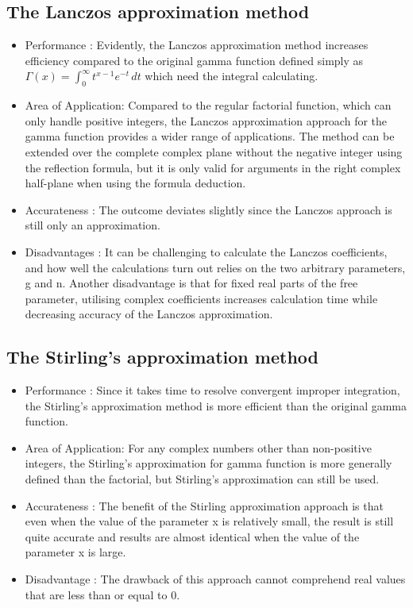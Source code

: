 \documentclass[a4paper, 11pt]{article}
\begin{document}
\subsection{ The Lanczos approximation method}
\begin{itemize}
    \item{Performance : Evidently, the Lanczos approximation method increases efficiency compared to the original gamma function defined simply as ${\displaystyle \Gamma (x)=\int _{0}^{\infty }t^{x-1}e^{-t}\,dt}$ which need the integral calculating.}
    
    \item{Area of Application: Compared to the regular factorial function, which can only handle positive integers, the Lanczos approximation approach for the gamma function provides a wider range of applications. The method can be extended over the complete complex plane without the negative integer using the reflection formula, but it is only valid for arguments in the right complex half-plane when using the formula deduction.}
    
    \item{Accurateness : The outcome deviates slightly since the Lanczos approach is still only an approximation.}
    
    \item{Disadvantages : It can be challenging to calculate the Lanczos coefficients, and how well the calculations turn out relies on the two arbitrary parameters, g and n. Another disadvantage is that for fixed real parts of the free parameter, utilising complex coefficients increases calculation time while decreasing accuracy of the Lanczos approximation.}
\end{itemize} 

\subsection{ The Stirling's approximation method}
\begin{itemize}
    \item{Performance : Since it takes time to resolve convergent improper integration, the Stirling's approximation method is more efficient than the original gamma function.}
    
    \item{Area of Application: For any complex numbers other than non-positive integers, the Stirling's approximation for gamma function is more generally defined than the factorial, but Stirling's approximation can still be used.}
    
    \item{Accurateness : The benefit of the Stirling approximation approach is that even when the value of the parameter x is relatively small, the result is still quite accurate and results are almost identical when the value of the parameter x is large.}

    \item{Disadvantage : The drawback of this approach cannot comprehend real values that are less than or equal to $0$.}
\end{itemize}
\end{document}
